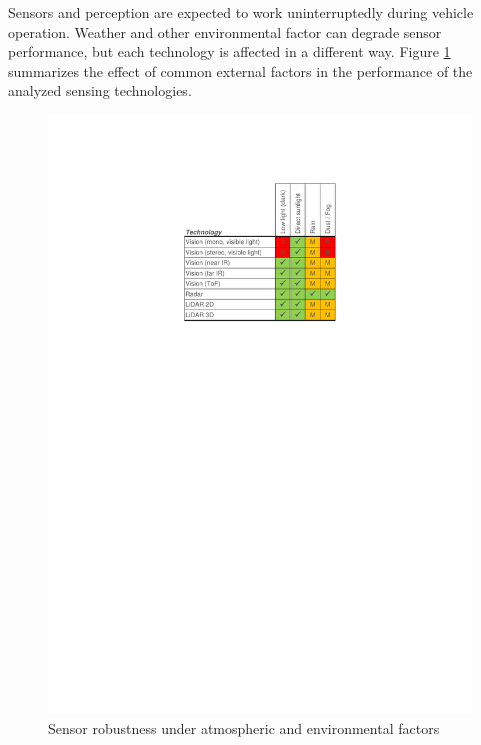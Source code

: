 Sensors and perception are expected to work uninterruptedly during vehicle 
operation. Weather and other environmental factor can degrade sensor
performance, but each technology is affected in a different way. 
Figure \ref{fig:sensors-environ} summarizes the effect of common external
factors in the performance of the analyzed sensing technologies.

\begin{figure}[h]
    \centering
    \includegraphics[width=0.75\linewidth]{"img/sensors_atmospheric_conditions"}
    \caption{Sensor robustness under atmospheric and environmental factors}
    \label{fig:sensors-environ}
\end{figure}

